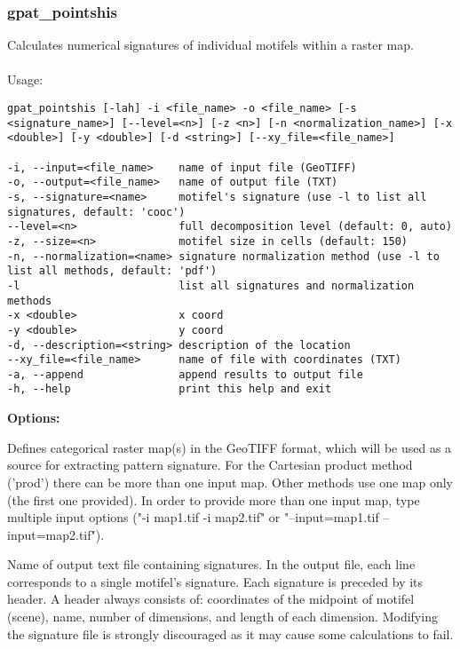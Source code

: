 \subsubsection{gpat\_pointshis}
Calculates numerical signatures of individual motifels within a raster map.
\\\\
Usage:

\begin{minipage}{\linewidth}
\begin{lstlisting}
gpat_pointshis [-lah] -i <file_name> -o <file_name> [-s <signature_name>] [--level=<n>] [-z <n>] [-n <normalization_name>] [-x <double>] [-y <double>] [-d <string>] [--xy_file=<file_name>]

-i, --input=<file_name>    name of input file (GeoTIFF)
-o, --output=<file_name>   name of output file (TXT)
-s, --signature=<name>     motifel's signature (use -l to list all signatures, default: 'cooc')
--level=<n>                full decomposition level (default: 0, auto)
-z, --size=<n>             motifel size in cells (default: 150)
-n, --normalization=<name> signature normalization method (use -l to list all methods, default: 'pdf')
-l                         list all signatures and normalization methods
-x <double>                x coord
-y <double>                y coord
-d, --description=<string> description of the location
--xy_file=<file_name>      name of file with coordinates (TXT)
-a, --append               append results to output file
-h, --help                 print this help and exit
\end{lstlisting}
\end{minipage}

{\bf Options:}


Defines categorical raster map(s) in the GeoTIFF format, which will be used as a source for extracting pattern signature.
For the Cartesian product method ('prod') there can be more than one input map. 
Other methods use one map only (the first one provided). 
In order to provide more than one input map, type multiple input options ("-i map1.tif -i map2.tif" or "--input=map1.tif --input=map2.tif").


Name of output text file containing signatures. 
In the output file, each line corresponds to a single motifel's signature. 
Each signature is preceded by its header.
A header always consists of: coordinates of the midpoint of motifel (scene), name, number of dimensions, and length of each dimension. 
Modifying the signature file is strongly discouraged as it may cause some calculations to fail.

